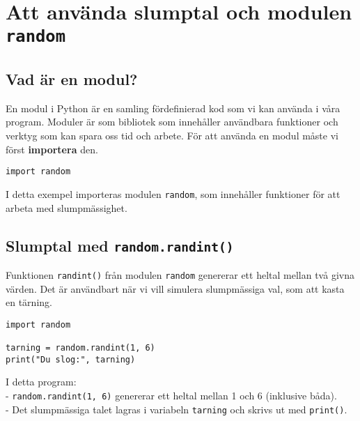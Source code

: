 
\section{Att använda slumptal och modulen \texttt{random}}
\label{section:random}
\subsection{Vad är en modul?}
En modul i Python är en samling fördefinierad kod som vi kan använda i våra program. Moduler är som bibliotek som innehåller användbara funktioner och verktyg som kan spara oss tid och arbete. För att använda en modul måste vi först \textbf{importera} den.

\begin{lstlisting}[title=Exempel på import]
import random
\end{lstlisting}

I detta exempel importeras modulen \texttt{random}, som innehåller funktioner för att arbeta med slumpmässighet.


\subsection{Slumptal med \texttt{random.randint()}}
Funktionen \texttt{randint()} från modulen \texttt{random} genererar ett heltal mellan två givna värden. Det är användbart när vi vill simulera slumpmässiga val, som att kasta en tärning.

\begin{lstlisting}[title=Exempel med \texttt{randint()}]
import random

tarning = random.randint(1, 6)
print("Du slog:", tarning)
\end{lstlisting}

I detta program:\\
- \texttt{random.randint(1, 6)} genererar ett heltal mellan 1 och 6 (inklusive båda).\\
- Det slumpmässiga talet lagras i variabeln \texttt{tarning} och skrivs ut med \texttt{print()}.\\



